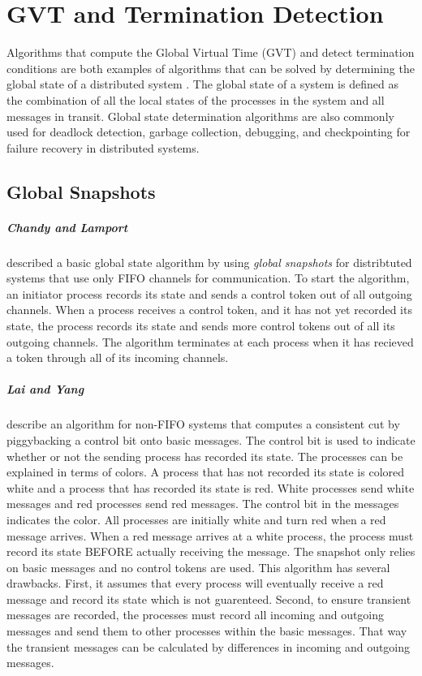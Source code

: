 \documentclass[11pt]{book}
\begin{document}
\chapter{GVT and Termination Detection}\label{gvt_termination}

Algorithms that compute the Global Virtual Time (GVT) and detect termination conditions are both
examples of algorithms that can be solved by determining the global state of a distributed system
\cite{chandy-85,lai-87,mattern-89}.  The global state of a system is defined as the combination of
all the local states of the processes in the system and all messages in transit.  Global state
determination algorithms are also commonly used for deadlock detection, garbage collection,
debugging, and checkpointing for failure recovery in distributed systems.

\section{Global Snapshots}

\paragraph{Chandy and Lamport} \cite{chandy-85} described a basic global state algorithm by using
\emph{global snapshots} for distribtuted systems that use only FIFO channels for communication.  To
start the algorithm, an initiator process records its state and sends a control token out of all
outgoing channels.  When a process receives a control token, and it has not yet recorded its state,
the process records its state and sends more control tokens out of all its outgoing channels.  The
algorithm terminates at each process when it has recieved a token through all of its incoming
channels.

\paragraph{Lai and Yang} \cite{lai-87} describe an algorithm for non-FIFO systems that computes a
consistent cut by piggybacking a control bit onto basic messages.  The control bit is used to
indicate whether or not the sending process has recorded its state.  The processes can be explained
in terms of colors.  A process that has not recorded its state is colored white and a process that
has recorded its state is red.  White processes send white messages and red processes send red
messages.  The control bit in the messages indicates the color.  All processes are initially white
and turn red when a red message arrives.  When a red message arrives at a white process, the process
must record its state BEFORE actually receiving the message.  The snapshot only relies on basic
messages and no control tokens are used.  This algorithm has several drawbacks.  First, it assumes
that every process will eventually receive a red message and record its state which is not
guarenteed.  Second, to ensure transient messages are recorded, the processes must record all
incoming and outgoing messages and send them to other processes within the basic messages.  That way
the transient messages can be calculated by differences in incoming and outgoing messages.
\end{document}

